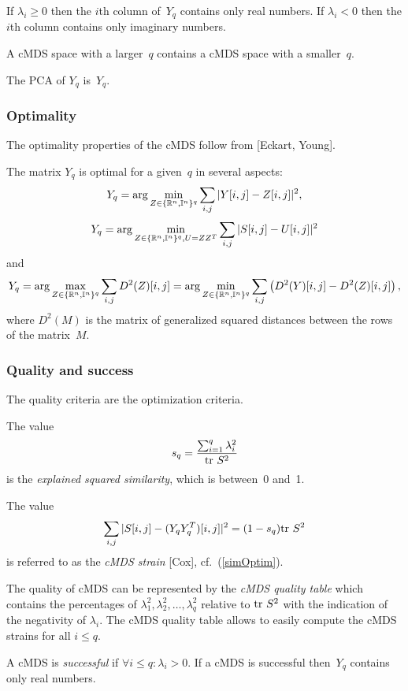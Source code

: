 \documentclass[10pt,a4paper]{article}
\begin{document}
If $\lambda_i \ge 0$ then the $i$th column of~$Y_q$ contains only real numbers.
If $\lambda_i < 0$ then the $i$th column contains only imaginary numbers.

A cMDS space with a larger~$q$ contains a cMDS space with a smaller~$q$.

The PCA of $Y_q$ is~$Y_q$.


\subsubsection{Optimality}

The optimality properties of the cMDS follow from [Eckart, Young].

The matrix $Y_q$ is optimal for a given~$q$ in several aspects:
$$ Y_q = \arg \min_{Z \in \{\mathbb R^n,\mathbb I^n\}^q} \sum_{i,j} |Y [i,j]-Z[i,j]|^2, $$
\begin{equation} \label{simOptim}
 Y_q = \arg \min_{Z\in \{\mathbb R^n,\mathbb I^n\}^q,U=ZZ^T} \sum_{i,j} |S[i,j]-U[i,j]|^2
\end{equation}
and
\begin{equation} \label{dist2Optim}
Y_q = \arg \max_{Z\in \{\mathbb R^n,\mathbb I^n\}^q} \sum_{i,j} D^2(Z)[i,j] =
  \arg \min_{Z \in \{\mathbb R^n,\mathbb I^n\}^q} \sum_{i,j} \left(D^2(Y)[i,j] - D^2(Z)[i,j] \right),
\end{equation}
where $D^2(M)$ is the matrix of generalized squared distances between the rows of the matrix~$M$.


\subsubsection {Quality and success}

The quality criteria are the optimization criteria.

The value
$$ s_q = \frac { \sum_{i=1}^q \lambda_i^2} {\mathrm {tr} \  S^2} $$
is the {\em explained squared similarity}, which is between~0 and~1.

The value
$$ \sum_{i,j} |S[i,j]-(Y_q Y_q^T)[i,j]|^2 = (1 - s_q) \mathrm {tr} \  S^2 $$
is referred to as the {\em cMDS strain} [Cox],
cf.~(\ref{simOptim}).

The quality of cMDS can be represented by the {\em cMDS quality table} which contains the percentages of $\lambda_1^2, \lambda_2^2, \dots, \lambda_q^2$ relative to $\mathrm {tr} \  S^2$ with the indication of the negativity of $\lambda_i$.
The cMDS quality table allows to easily compute the cMDS strains for all $i \le q$.

A cMDS is {\em successful} if $\forall i \le q : \lambda_i > 0$.
If a cMDS is successful then~$Y_q$ contains only real numbers.
\end{document}
